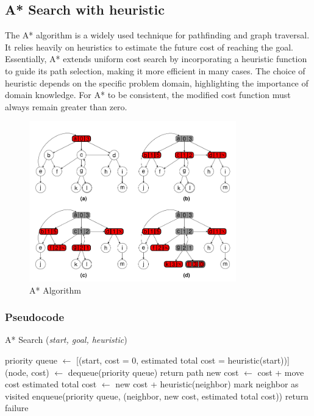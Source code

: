 \subsection{A* Search with heuristic}
\noindent The A* algorithm is a widely used technique for pathfinding and graph traversal. It relies heavily on heuristics to estimate the future cost of reaching the goal. Essentially, A* extends uniform cost search by incorporating a heuristic function to guide its path selection, making it more efficient in many cases. The choice of heuristic depends on the specific problem domain, highlighting the importance of domain knowledge. For A* to be consistent, the modified cost function must always remain greater than zero.

\begin{figure}[H]
	\centering
	\includegraphics[width=0.8\textwidth]{./imgs/astar.png}
	\caption{A* Algorithm}
\end{figure}

\subsubsection{Pseudocode}
\begin{algorithm}[H]
	\caption{A* Search (\textit{start, goal, heuristic})}
	\label{alg:astar}
	\begin{algorithmic}[1]
		\State priority queue \(\gets\) [(start, cost = 0, estimated total cost = heuristic(start))]
		\State (node, cost) \(\gets\) dequeue(priority queue)
		\State return path
		\EndIf
		\State new cost \(\gets\) cost + move cost
		\State estimated total cost \(\gets\) new cost + heuristic(neighbor)
		\State mark neighbor as visited
		\State enqueue(priority queue, (neighbor, new cost, estimated total cost))
		\EndIf
		\EndFor
		\EndWhile
		\State return failure
	\end{algorithmic}
\end{algorithm}


